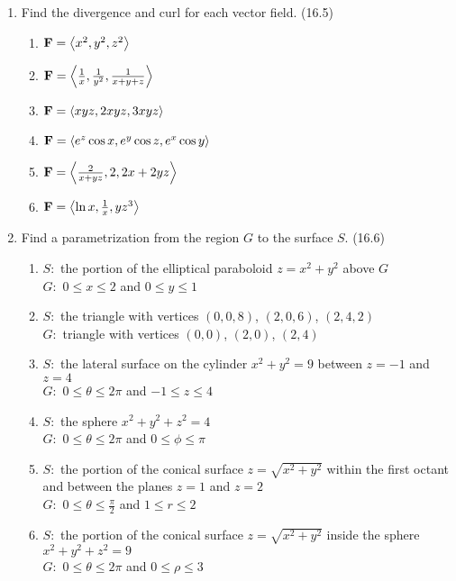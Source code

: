 \begin{enumerate}
    \item Find the divergence and curl for each vector field. (16.5)

      \begin{enumerate}
        \item $\mathbf{F}=\left<x^2,y^2,z^2\right>$
        \item $\mathbf{F}=\left<\frac{1}{x},\frac{1}{y^2},\frac{1}{x+y+z}\right>$
        \item $\mathbf{F}=\left<xyz,2xyz,3xyz\right>$
        \item $\mathbf{F}=\left<e^z\cos x,e^y\cos z,e^x\cos y\right>$
        \item $\mathbf{F}=\left<\frac{2}{x+yz},2,2x+2yz\right>$
        \item $\mathbf{F}=\left<\ln x,\frac{1}{x},yz^3\right>$
      \end{enumerate}

    \item Find a parametrization from the region $G$ to the surface $S$. (16.6)

      \begin{enumerate}
        \item 
          $S:$ the portion of the elliptical paraboloid $z=x^2+y^2$ above $G$\\
          $G:$ $0\leq x\leq 2$ and $0\leq y\leq 1$
        \item 
          $S:$ the triangle with vertices $(0,0,8)$, $(2,0,6)$, $(2,4,2)$\\
          $G:$ triangle with vertices $(0,0)$, $(2,0)$, $(2,4)$
        \item  
          $S:$ the lateral surface on the cylinder $x^2+y^2=9$ between $z=-1$ and $z=4$\\
          $G:$ $0\leq\theta\leq 2\pi$ and $-1\leq z\leq 4$
        \item   
          $S:$ the sphere $x^2+y^2+z^2=4$\\
          $G:$ $0\leq\theta\leq 2\pi$ and $0\leq\phi\leq\pi$
        \item  
          $S:$ the portion of the conical surface $z=\sqrt{x^2+y^2}$ within the first octant and between the planes $z=1$ and $z=2$\\
          $G:$ $0\leq\theta\leq \frac{\pi}{2}$ and $1\leq r\leq 2$
        \item 
          $S:$ the portion of the conical surface $z=\sqrt{x^2+y^2}$ inside the sphere $x^2+y^2+z^2=9$\\
          $G:$ $0\leq\theta\leq 2\pi$ and $0\leq \rho\leq 3$
      \end{enumerate}


\end{enumerate}
